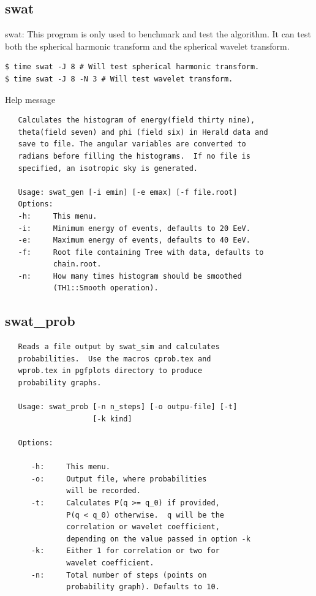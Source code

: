 \documentclass[12pt]{article}
\begin{document}
\subsection{swat}
swat: This program is only used to benchmark and test the algorithm. It can test
both the spherical harmonic transform and the spherical wavelet transform.
{\bf \color{brown}
\begin{lstlisting}
$ time swat -J 8 # Will test spherical harmonic transform.
$ time swat -J 8 -N 3 # Will test wavelet transform.
\end{lstlisting}
}

Help message
{\bf \color{textcolor}
   \begin{lstlisting}
   Calculates the histogram of energy(field thirty nine),
   theta(field seven) and phi (field six) in Herald data and
   save to file. The angular variables are converted to
   radians before filling the histograms.  If no file is
   specified, an isotropic sky is generated.

   Usage: swat_gen [-i emin] [-e emax] [-f file.root]
   Options:
   -h:     This menu.
   -i:     Minimum energy of events, defaults to 20 EeV.
   -e:     Maximum energy of events, defaults to 40 EeV.
   -f:     Root file containing Tree with data, defaults to
           chain.root.
   -n:     How many times histogram should be smoothed
           (TH1::Smooth operation).
   \end{lstlisting}
}

\subsection{swat\_prob}
{\bf \color{textcolor}
   \begin{lstlisting}
   Reads a file output by swat_sim and calculates
   probabilities.  Use the macros cprob.tex and
   wprob.tex in pgfplots directory to produce
   probability graphs.

   Usage: swat_prob [-n n_steps] [-o outpu-file] [-t] 
                    [-k kind]

   Options:

      -h:     This menu.
      -o:     Output file, where probabilities
              will be recorded.
      -t:     Calculates P(q >= q_0) if provided,
              P(q < q_0) otherwise.  q will be the
              correlation or wavelet coefficient,
              depending on the value passed in option -k
      -k:     Either 1 for correlation or two for
              wavelet coefficient.
      -n:     Total number of steps (points on
              probability graph). Defaults to 10.

   \end{lstlisting}
}
\end{document}
